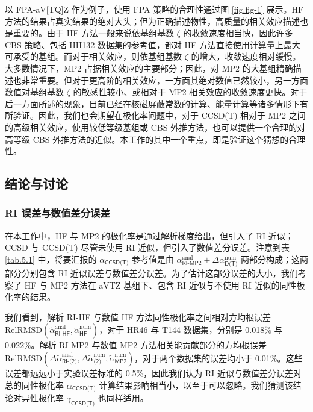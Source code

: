 以 FPA-aV[TQ]Z 作为例子，使用 FPA 策略的合理性通过图 \ref{fig.fig-1} 展示。HF 方法的结果占真实结果的绝对大头；但为正确描述物性，高质量的相关效应描述也是重要的。由于 HF 方法一般来说依基组基数 $\zeta$ 的收敛速度相当快\cite{Jensen-Jensen.TCA.2005, Karton-Martin.TCA.2006}，因此许多 CBS 策略、包括 HH132 数据集的参考值，都对 HF 方法直接使用计算量上最大可承受的基组。而对于相关效应，则依基组基数 $\zeta$ 的增大，收敛速度相对缓慢。大多数情况下，MP2 占据相关效应的主要部分；因此，对 MP2 的大基组精确描述也非常重要。但对于更高阶的相关效应，一方面其绝对数值已然较小，另一方面数值对基组基数 $\zeta$ 的敏感性较小、或相对于 MP2 相关效应的收敛速度更快。对于后一方面所述的现象，目前已经在核磁屏蔽常数的计算\cite{Sun-Xu.JCP.2013, Wang-Xu.JCP.2018, Gregusova-Bartlett.JCTC.2010}、能量计算\cite{Truhlar-Truhlar.CPL.1998}等诸多情形下有所验证。因此，我们也会期望在极化率问题中，对于 CCSD(T) 相对于 MP2 之间的高级相关效应，使用较低等级基组或 CBS 外推方法，也可以提供一个合理的对高等级 CBS 外推方法的近似。本工作的其中一个重点，即是验证这个猜想的合理性。

\subsection{结论与讨论}

\subsubsection{RI 误差与数值差分误差}

在本工作中，HF 与 MP2 的极化率是通过解析梯度给出，但引入了 RI 近似；CCSD 与 CCSD(T) 尽管未使用 RI 近似，但引入了数值差分误差。注意到表 \ref{tab.5.1} 中，将要汇报的 $\alpha_\textsf{CCSD(T)}$ 参考值是由 $\alpha^\text{anal}_\textsf{RI-MP2} + \Delta \alpha^\text{num}_\textsf{D(T)}$ 两部分构成；这两部分分别包含 RI 近似误差与数值差分误差。为了估计这部分误差的大小，我们考察了 HF 与 MP2 方法在 aVTZ 基组下、包含 RI 近似与不使用 RI 近似的同性极化率的结果。

我们看到，解析 RI-HF 与数值 HF 方法同性极化率之间相对方均根误差 $\text{RelRMSD} (\tilde \alpha_\textsf{RI-HF}^\text{anal}, \tilde \alpha^\text{num}_\textsf{HF})$，对于 HR46 与 T144 数据集，分别是 0.018\% 与 0.022\%。解析 RI-MP2 与数值 MP2 方法相关能贡献部分的方均根误差 $\text{RelRMSD} (\Delta \tilde \alpha^\text{anal}_\textsf{RI-(2)}, \Delta \tilde \alpha^\text{num}_\textsf{(2)}, \tilde \alpha^\text{num}_\textsf{MP2})$，对于两个数据集的误差均小于 0.01\%。这些误差都远远小于实验误差标准的 0.5\%，因此我们认为 RI 近似与数值差分误差对总的同性极化率 $\alpha_\textsf{CCSD(T)}$ 计算结果影响相当小，以至于可以忽略。我们猜测该结论对异性极化率 $\gamma_\textsf{CCSD(T)}$ 也同样适用。


